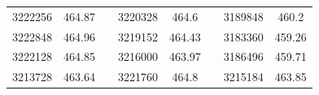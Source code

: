 \documentclass[12pt]{mwart}
\begin{document}
\begin{table}[H]
\begin{tabular}{cclcclcc}
		3222256                                                  & 464.87                                                        &  & 3220328                                                  & 464.6                                                         &  & 3189848                                                  & 460.2                                                         \\
		3222848                                                  & 464.96                                                        &  & 3219152                                                  & 464.43                                                        &  & 3183360                                                  & 459.26                                                        \\
		3222128                                                  & 464.85                                                        &  & 3216000                                                  & 463.97                                                        &  & 3186496                                                  & 459.71                                                        \\
		3213728                                                  & 463.64                                                        &  & 3221760                                                  & 464.8                                                         &  & 3215184                                                  & 463.85                                                       
	\end{tabular}
	\end{table}
\end{document}
